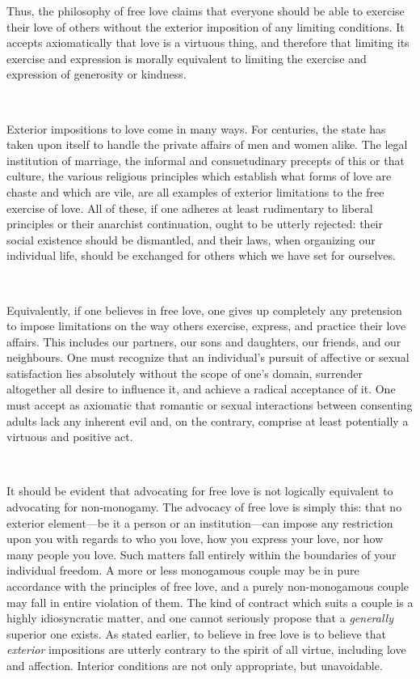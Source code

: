 \documentclass[a4paper, 12pt]{article}
\begin{document}
Thus, the philosophy of free love claims that everyone should be able to
exercise their love of others without the exterior imposition of any limiting
conditions. It accepts axiomatically that love is a virtuous thing, and
therefore that limiting its exercise and expression is morally equivalent to
limiting the exercise and expression of generosity or kindness. 

~ 

Exterior impositions to love come in many ways. For centuries, the state has
taken upon itself to handle the private affairs of men and women alike. The
legal institution of marriage, the informal and consuetudinary precepts of this
or that culture, the various religious principles which establish what forms
of love are chaste and which are vile, are all examples of exterior limitations
to the free exercise of love. All of these, if one adheres at least rudimentary
to liberal principles or their anarchist continuation, ought to be utterly
rejected: their social existence should be dismantled, and their laws, when
organizing our individual life, should be exchanged for others which we have
set for ourselves.

~

Equivalently, if one believes in free love, one gives up completely any
pretension to impose limitations on the way others exercise, express, and
practice their love affairs. This includes our partners, our sons and
daughters, our friends, and our neighbours. One must recognize that an
individual's pursuit of affective or sexual satisfaction lies absolutely
without the scope of one's domain, surrender altogether all desire to influence
it, and achieve a radical acceptance of it. One must accept as axiomatic that 
romantic or sexual interactions between consenting adults lack any inherent evil
and, on the contrary, comprise at least potentially a virtuous and positive act.

~

It should be evident that advocating for free love is not logically equivalent
to advocating for non-monogamy. The advocacy of free love is simply this: that
no exterior element---be it a person or an institution---can impose any
restriction upon you with regards to who you love, how you express your love,
nor how many people you love. Such matters fall entirely within the boundaries
of your individual freedom. A more or less monogamous couple may be in pure
accordance with the principles of free love, and a purely non-monogamous couple may
fall in entire violation of them. The kind of contract which suits a couple is
a highly idiosyncratic matter, and one cannot seriously propose that a
\textit{generally} superior one exists. As stated earlier, to believe in free
love is to believe that \textit{exterior} impositions are utterly contrary to
the spirit of all virtue, including love and affection. Interior conditions
are not only appropriate, but unavoidable.
\end{document}
